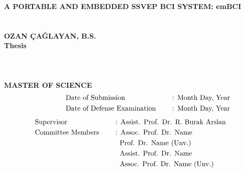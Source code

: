 \clearpage
\setcounter{page}{1}
\thispagestyle{empty}
{
\vspace*{-7.5mm}
\centering\textbf{A PORTABLE AND EMBEDDED SSVEP BCI SYSTEM: emBCI}\\\vspace*{1.5mm}
\\\vspace*{1.5mm}
\vspace*{13mm}
\\\vspace*{1.5mm}
\centering\textbf{OZAN ÇAĞLAYAN, B.S.}\\
\vspace*{30pt}
\centering\textbf{Thesis}\\\vspace*{1.5mm}
\\\vspace*{1.5mm}
\\\vspace*{1.5mm}
\\
\vspace*{30pt}
\centering\textbf{MASTER OF SCIENCE}\\
\vspace*{10pt}
\begin{alignat*}{2}
 & \quad\quad\quad\quad\quad\text{Date of Submission \quad } && \text{: Month Day, Year} \\
 & \quad\quad\quad\quad\quad\text{Date of Defense Examination \quad } && \text{: Month Day, Year}
\end{alignat*}
\vspace*{10pt}
\begin{alignat*}{2}
 & \text{Supervisor} && \text{: Assist. Prof. Dr. R. Burak Arslan} \\
 & \text{Committee Members \quad } && \text{: Assoc. Prof. Dr. Name} \\
 & \text{} && \text{\; Prof. Dr. Name (Unv.)} \\
 & \text{} && \text{\; Assist. Prof. Dr. Name} \\
 & \text{} && \text{\; Assoc. Prof. Dr. Name (Unv.)}
\end{alignat*}
}